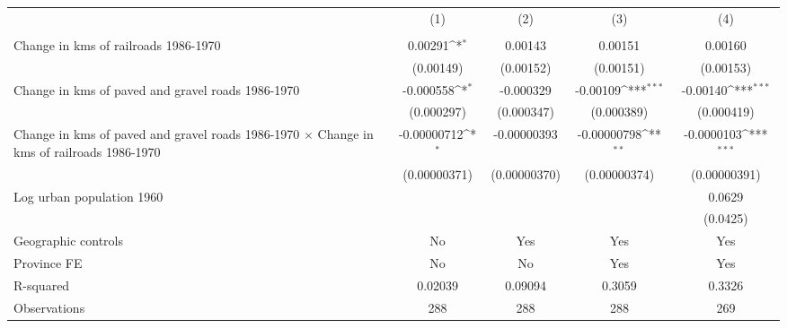 {
\def\sym#1{\ifmmode^{#1}\else\(^{#1}\)\fi}
\begin{tabular}{l*{4}{c}}
\hline\hline
                &\multicolumn{1}{c}{(1)}&\multicolumn{1}{c}{(2)}&\multicolumn{1}{c}{(3)}&\multicolumn{1}{c}{(4)}\\
                &\multicolumn{1}{c}{}&\multicolumn{1}{c}{}&\multicolumn{1}{c}{}&\multicolumn{1}{c}{}\\
\hline
Change in kms of railroads 1986-1970&  0.00291\sym{*}  &  0.00143         &  0.00151         &  0.00160         \\
                &(0.00149)         &(0.00152)         &(0.00151)         &(0.00153)         \\
[1em]
Change in kms of paved and gravel roads 1986-1970&-0.000558\sym{*}  &-0.000329         & -0.00109\sym{***}& -0.00140\sym{***}\\
                &(0.000297)         &(0.000347)         &(0.000389)         &(0.000419)         \\
[1em]
Change in kms of paved and gravel roads 1986-1970 $\times$ Change in kms of railroads 1986-1970&-0.00000712\sym{*}  &-0.00000393         &-0.00000798\sym{**} &-0.0000103\sym{***}\\
                &(0.00000371)         &(0.00000370)         &(0.00000374)         &(0.00000391)         \\
[1em]
Log urban population 1960&                  &                  &                  &   0.0629         \\
                &                  &                  &                  & (0.0425)         \\
\hline
Geographic controls&       No         &      Yes         &      Yes         &      Yes         \\
Province FE     &       No         &       No         &      Yes         &      Yes         \\
R-squared       &  0.02039         &  0.09094         &   0.3059         &   0.3326         \\
Observations    &      288         &      288         &      288         &      269         \\
\hline\hline
\end{tabular}
}

